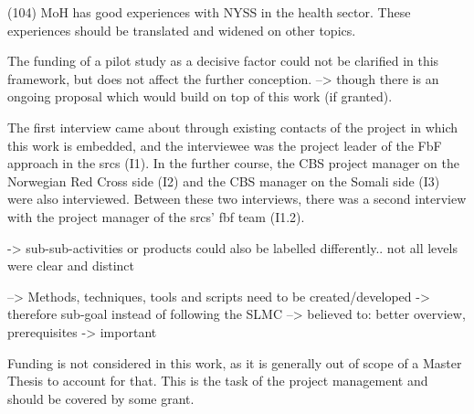 (104) MoH has good experiences with NYSS in the health sector. These experiences should be translated and widened on other topics.

The funding of a pilot study as a decisive factor could not be clarified in this framework, but does not affect the further conception. --> though there is an ongoing proposal which would build on top of this work (if granted).

The first interview came about through existing contacts of the project in which this work is embedded, and the interviewee was the project leader of the FbF approach in the \acrshort{srcs} (I1). In the further course, the CBS project manager on the Norwegian Red Cross side (I2) and the CBS manager on the Somali side (I3) were also interviewed. Between these two interviews, there was a second interview with the project manager of the \acrshort{srcs}' \acrshort{fbf} team (I1.2).


-> sub-sub-activities or products could also be labelled differently.. not all levels were clear and distinct

--> Methods, techniques, tools and scripts need to be created/developed -> therefore sub-goal instead of following the SLMC --> believed to: better overview, prerequisites -> important




Funding is not considered in this work, as it is generally out of scope of a Master Thesis to account for that. This is the task of the project management and should be covered by some grant.



